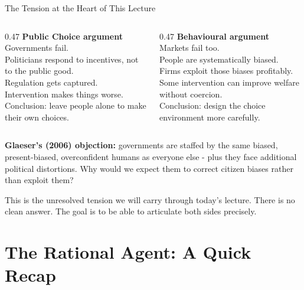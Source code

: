 \documentclass[10pt]{beamer}
\begin{document}
\begin{frame}[allowframebreaks]{The Tension at the Heart of This Lecture}

\begin{columns}[T]
\begin{column}{0.47\textwidth}
\textbf{\color{myTeal} Public Choice argument}\\[6pt]
Governments fail.\\
Politicians respond to incentives, not to the public good.\\
Regulation gets captured.\\
Intervention makes things worse.\\[6pt]
\footnotesize \alert{Conclusion:} leave people alone to make their own choices.
\end{column}
\begin{column}{0.47\textwidth}
\textbf{\color{myOrange} Behavioural argument}\\[6pt]
Markets fail too.\\
People are systematically biased.\\
Firms exploit those biases profitably.\\
Some intervention can improve welfare without coercion.\\[6pt]
\footnotesize \alert{Conclusion:} design the choice environment more carefully.
\end{column}
\end{columns}

\vspace{0.4cm}
\textbf{Glaeser's (2006) objection:} governments are staffed by the same biased, present-biased, overconfident humans as everyone else - plus they face additional political distortions.
Why would we expect them to correct citizen biases rather than exploit them?


\alert{This is the unresolved tension we will carry through today's lecture.}
There is no clean answer.
The goal is to be able to articulate both sides precisely.
\end{frame}


\section{The Rational Agent: A Quick Recap}
\end{document}
